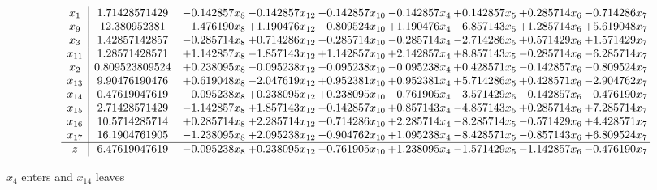 \documentclass[10pt]{article}
\begin{document}
 \[\begin{array}{c| c c@{\hskip 2pt} c@{\hskip 2pt} c@{\hskip 2pt} c@{\hskip 2pt} c@{\hskip 2pt} c@{\hskip 2pt} c@{\hskip 2pt} }
 x_{1}   &  1.71428571429 & -0.142857 x_{8} & -0.142857 x_{12} & -0.142857 x_{10} & -0.142857 x_{4} & + 0.142857 x_{5} & + 0.285714 x_{6} & -0.714286 x_{7}\\
 x_{9}   &  12.380952381 & -1.476190 x_{8} & + 1.190476 x_{12} & -0.809524 x_{10} & + 1.190476 x_{4} & -6.857143 x_{5} & + 1.285714 x_{6} & + 5.619048 x_{7}\\
 x_{3}   &  1.42857142857 & -0.285714 x_{8} & + 0.714286 x_{12} & -0.285714 x_{10} & -0.285714 x_{4} & -2.714286 x_{5} & + 0.571429 x_{6} & + 1.571429 x_{7}\\
 x_{11}   &  1.28571428571 & + 1.142857 x_{8} & -1.857143 x_{12} & + 1.142857 x_{10} & + 2.142857 x_{4} & + 8.857143 x_{5} & -0.285714 x_{6} & -6.285714 x_{7}\\
 x_{2}   &  0.809523809524 & + 0.238095 x_{8} & -0.095238 x_{12} & -0.095238 x_{10} & -0.095238 x_{4} & + 0.428571 x_{5} & -0.142857 x_{6} & -0.809524 x_{7}\\
 x_{13}   &  9.90476190476 & + 0.619048 x_{8} & -2.047619 x_{12} & + 0.952381 x_{10} & + 0.952381 x_{4} & + 5.714286 x_{5} & + 0.428571 x_{6} & -2.904762 x_{7}\\
 x_{14}   &  0.47619047619 & -0.095238 x_{8} & + 0.238095 x_{12} & + 0.238095 x_{10} & -0.761905 x_{4} & -3.571429 x_{5} & -0.142857 x_{6} & -0.476190 x_{7}\\
 x_{15}   &  2.71428571429 & -1.142857 x_{8} & + 1.857143 x_{12} & -0.142857 x_{10} & + 0.857143 x_{4} & -4.857143 x_{5} & + 0.285714 x_{6} & + 7.285714 x_{7}\\
 x_{16}   &  10.5714285714 & + 0.285714 x_{8} & + 2.285714 x_{12} & -0.714286 x_{10} & + 2.285714 x_{4} & -8.285714 x_{5} & -0.571429 x_{6} & + 4.428571 x_{7}\\
 x_{17}   &  16.1904761905 & -1.238095 x_{8} & + 2.095238 x_{12} & -0.904762 x_{10} & + 1.095238 x_{4} & -8.428571 x_{5} & -0.857143 x_{6} & + 6.809524 x_{7}\\
\hline
z    &  6.47619047619 & -0.095238 x_{8} & + 0.238095 x_{12} & -0.761905 x_{10} & + 1.238095 x_{4} & -1.571429 x_{5} & -1.142857 x_{6} & -0.476190 x_{7}\\
\end{array}\]


 $ x_{4} $ enters and $ x_{14} $ leaves 
\end{document}
